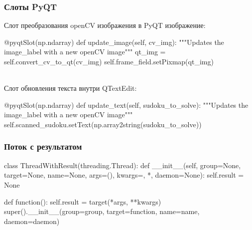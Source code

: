 \documentclass{beamer}
\begin{document}
\begin{frame}[fragile]
\frametitle{Слоты PyQT}

Слот преобразования openCV изображения в PyQT изображение:
\begin{pythoncode}
    @pyqtSlot(np.ndarray)
    def update_image(self, cv_img):
        """Updates the image_label with a new openCV image"""
        qt_img = self.convert_cv_to_qt(cv_img)
        self.frame_field.setPixmap(qt_img)
\end{pythoncode}
\ \\
Слот обновления текста внутри QTextEdit:
\begin{pythoncode}
    @pyqtSlot(np.ndarray)
    def update_text(self, sudoku_to_solve):
        """Updates the image_label with a new openCV image"""
        self.scanned_sudoku.setText(np.array2string(sudoku_to_solve))
\end{pythoncode}

\end{frame}


\begin{frame}[fragile]
\frametitle{Поток с результатом}
\begin{pythoncode}
class ThreadWithResult(threading.Thread):
    def __init__(self, group=None, target=None, name=None,
                 args=(), kwargs={}, *, daemon=None):
        self.result = None

        def function():
            self.result = target(*args, **kwargs)
        super().__init__(group=group, target=function,
                         name=name, daemon=daemon)
\end{pythoncode}

\end{frame}
\end{document}
